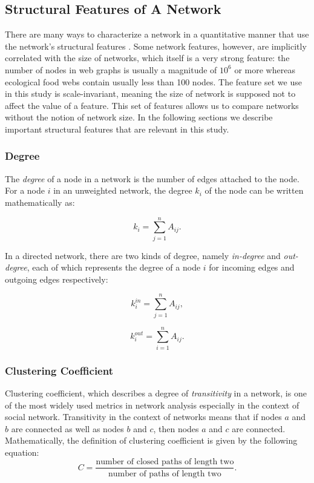 \documentclass{article}
\begin{document}
	\subsection{Structural Features of A Network}
	There are many ways to characterize a network in a quantitative manner that use the network's structural features \cite{Newman:NetworksIntro,NetworkCharacterizationSurvey}. Some network features, however, are implicitly correlated with the size of networks, which itself is a very strong feature: the number of nodes in web graphs is usually a magnitude of $10^6$ or more whereas ecological food webs contain usually less than 100 nodes. The feature set we use in this study is scale-invariant, meaning the size of network is supposed not to affect the value of a feature. This set of features allows us to compare networks without the notion of network size. In the following sections we describe important structural features that are relevant in this study.
		
	 
	\subsubsection{Degree}
	The \textit{degree} of a node in a network is the number of edges attached to the node. For a node $i$ in an unweighted network, the degree $k_i$ of the node can be written mathematically as:
	
	\begin{equation}
 	 k_i = \sum_{j = 1}^n A_{ij}.
	\end{equation}
	
	In a directed network, there are two kinds of degree, namely \textit{in-degree} and \textit{out-degree}, each of which represents the degree of a node $i$ for incoming edges and outgoing edges respectively:
	
	\begin{equation}
 	 k_i^{in} = \sum_{j = 1}^n A_{ij},
	\end{equation}
	
	\begin{equation}
 	 k_i^{out} = \sum_{i = 1}^n A_{ij}.
	\end{equation}

	
	\subsubsection{Clustering Coefficient}
	Clustering coefficient, which describes a degree of \textit{transitivity} in a network, is one of the most widely used metrics in network analysis especially in the context of social network. Transitivity in the context of networks means that if nodes $a$ and $b$ are connected as well as nodes $b$ and $c$, then nodes $a$ and $c$ are connected. Mathematically, the definition of clustering coefficient is given by the following equation:
	\begin{equation}
	C = \frac{\text{number of closed paths of length two}}{\text{number of paths of length two}}.
	\end{equation}
	
\end{document}
